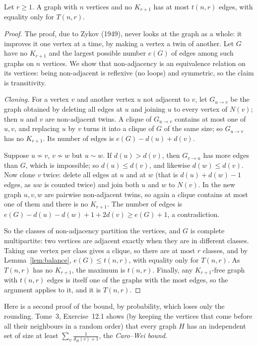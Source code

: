 \begin{theorem}[Tur\'an, 1941]\label{thm:turan}
Let $r\ge1$. A graph with $n$ vertices and no $K_{r+1}$ has at most $t(n,r)$ edges, with equality only for $T(n,r)$.
\end{theorem}
\begin{proof}
The proof, due to Zykov (1949), never looks at the graph as a whole: it improves it one vertex at a time, by making a vertex a twin of another.
Let $G$ have no $K_{r+1}$ and the largest possible number $e(G)$ of edges among such graphs on $n$ vertices. We show that non-adjacency is an
equivalence relation on its vertices: being non-adjacent is reflexive (no loops) and symmetric, so the claim is transitivity.

\emph{Cloning.} For a vertex $v$ and another vertex $u$ not adjacent to $v$, let $G_{u\to v}$ be the graph obtained by deleting all edges at $u$ and joining $u$ to
every vertex of $N(v)$; then $u$ and $v$ are non-adjacent twins. A clique of $G_{u\to v}$ contains at most one of $u,v$, and replacing $u$ by $v$ turns
it into a clique of $G$ of the same size; so $G_{u\to v}$ has no $K_{r+1}$. Its number of edges is $e(G)-d(u)+d(v)$.

Suppose $u\not\sim v$, $v\not\sim w$ but $u\sim w$. If $d(u)>d(v)$, then $G_{v\to u}$ has more edges than $G$, which is impossible; so $d(u)\le d(v)$, and likewise
$d(w)\le d(v)$. Now clone $v$ twice: delete all edges at $u$ and at $w$ (that is $d(u)+d(w)-1$ edges, as $uw$ is counted twice) and join both $u$ and $w$ to
$N(v)$. In the new graph $u,v,w$ are pairwise non-adjacent twins, so again a clique contains at most one of them and there is no $K_{r+1}$. The number of
edges is $e(G)-d(u)-d(w)+1+2d(v)\ge e(G)+1$, a contradiction.

So the classes of non-adjacency partition the vertices, and $G$ is complete multipartite: two vertices are adjacent exactly when they are in different classes.
Taking one vertex per class gives a clique, so there are at most $r$ classes, and by Lemma~\ref{lem:balance}, $e(G)\le t(n,r)$, with equality only for
$T(n,r)$. As $T(n,r)$ has no $K_{r+1}$, the maximum is $t(n,r)$. Finally, any $K_{r+1}$-free graph with $t(n,r)$ edges is itself one of the graphs with the most edges,
so the argument applies to it, and it is $T(n,r)$.
\end{proof}

Here is a second proof of the bound, by probability, which loses only the rounding. Tome~3, Exercise~12.1 shows (by keeping the vertices that come
before all their neighbours in a random order) that every graph $H$ has an independent set of size at least $\sum_v\frac1{d_H(v)+1}$, the
\emph{Caro--Wei bound}.

